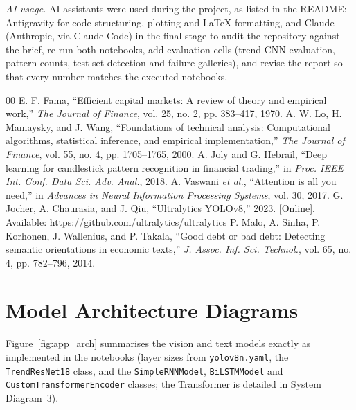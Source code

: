 \documentclass[10pt,journal]{IEEEtran}
\begin{document}
\textit{AI usage.} AI assistants were used during the project, as listed in the README: Antigravity for code structuring, plotting and LaTeX formatting, and Claude (Anthropic, via Claude Code) in the final stage to audit the repository against the brief, re-run both notebooks, add evaluation cells (trend-CNN evaluation, pattern counts, test-set detection and failure galleries), and revise the report so that every number matches the executed notebooks.


\begin{thebibliography}{00}
 E. F. Fama, ``Efficient capital markets: A review of theory and empirical work,'' \textit{The Journal of Finance}, vol. 25, no. 2, pp. 383--417, 1970.
 A. W. Lo, H. Mamaysky, and J. Wang, ``Foundations of technical analysis: Computational algorithms, statistical inference, and empirical implementation,'' \textit{The Journal of Finance}, vol. 55, no. 4, pp. 1705--1765, 2000.
 A. Joly and G. Hebrail, ``Deep learning for candlestick pattern recognition in financial trading,'' in \textit{Proc. IEEE Int. Conf. Data Sci. Adv. Anal.}, 2018.
 A. Vaswani \textit{et al.}, ``Attention is all you need,'' in \textit{Advances in Neural Information Processing Systems}, vol. 30, 2017.
 G. Jocher, A. Chaurasia, and J. Qiu, ``Ultralytics YOLOv8,'' 2023. [Online]. Available: https://github.com/ultralytics/ultralytics
 P. Malo, A. Sinha, P. Korhonen, J. Wallenius, and P. Takala, ``Good debt or bad debt: Detecting semantic orientations in economic texts,'' \textit{J. Assoc. Inf. Sci. Technol.}, vol. 65, no. 4, pp. 782--796, 2014.
\end{thebibliography}

\clearpage
\onecolumn
\appendices

\section{Model Architecture Diagrams}
Figure~\ref{fig:app_arch} summarises the vision and text models exactly as implemented in the notebooks (layer sizes from \texttt{yolov8n.yaml}, the \texttt{TrendResNet18} class, and the \texttt{SimpleRNNModel}, \texttt{BiLSTMModel} and \texttt{CustomTransformerEncoder} classes; the Transformer is detailed in System Diagram~3).
\end{document}

